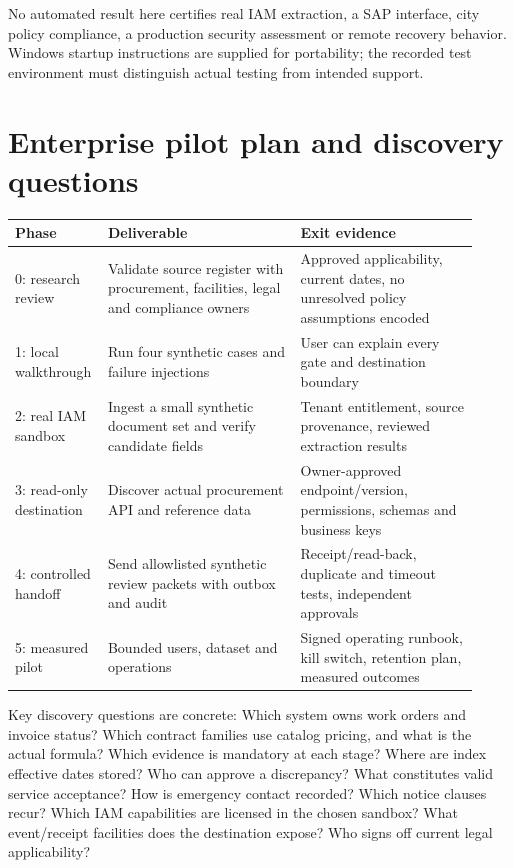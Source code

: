 \documentclass[11pt,letterpaper]{article}
\begin{document}
No automated result here certifies real IAM extraction, a SAP interface, city policy compliance, a production security assessment or remote recovery behavior. Windows startup instructions are supplied for portability; the recorded test environment must distinguish actual testing from intended support.

\section{Enterprise pilot plan and discovery questions}
\begin{longtable}{p{0.15\linewidth}p{0.40\linewidth}p{0.37\linewidth}}
\toprule Phase & Deliverable & Exit evidence\\\midrule
0: research review & Validate source register with procurement, facilities, legal and compliance owners & Approved applicability, current dates, no unresolved policy assumptions encoded\\
1: local walkthrough & Run four synthetic cases and failure injections & User can explain every gate and destination boundary\\
2: real IAM sandbox & Ingest a small synthetic document set and verify candidate fields & Tenant entitlement, source provenance, reviewed extraction results\\
3: read-only destination & Discover actual procurement API and reference data & Owner-approved endpoint/version, permissions, schemas and business keys\\
4: controlled handoff & Send allowlisted synthetic review packets with outbox and audit & Receipt/read-back, duplicate and timeout tests, independent approvals\\
5: measured pilot & Bounded users, dataset and operations & Signed operating runbook, kill switch, retention plan, measured outcomes\\
\bottomrule
\end{longtable}

Key discovery questions are concrete: Which system owns work orders and invoice status? Which contract families use catalog pricing, and what is the actual formula? Which evidence is mandatory at each stage? Where are index effective dates stored? Who can approve a discrepancy? What constitutes valid service acceptance? How is emergency contact recorded? Which notice clauses recur? Which IAM capabilities are licensed in the chosen sandbox? What event/receipt facilities does the destination expose? Who signs off current legal applicability?
\end{document}
